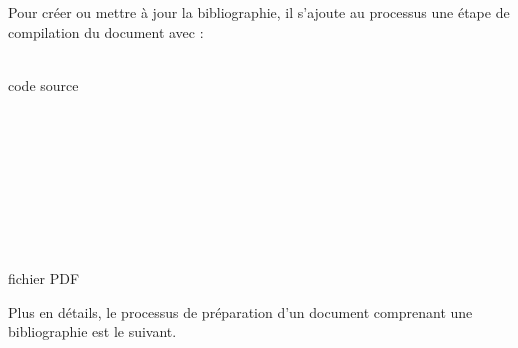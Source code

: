 Pour créer ou mettre à jour la bibliographie, il s'ajoute au processus
une étape de compilation du document avec {\BibTeX}:
\begin{center}
  \sffamily
  \begin{minipage}[t]{0.12\linewidth}
    \centering
    {\LARGE\faFile[regular]} \\ \medskip
    code source
  \end{minipage}
  \quad\faArrowRight\quad
  \begin{minipage}[t]{0.12\linewidth}
    \centering
    {\LARGE\faCogs} \\ \medskip
     \\ 
  \end{minipage}
  \quad\faArrowRight\quad
  \begin{minipage}[t]{0.12\linewidth}
    \centering
    {\LARGE\faCogs} \\ \medskip
  \end{minipage}
  \quad\faArrowRight\quad
  \begin{minipage}[t]{0.12\linewidth}
    \centering
    {\LARGE\faCogs}\;
    \raisebox{2pt}{\small $\times 2$} \\ \medskip
     \\ 
  \end{minipage}
  \quad\faArrowRight\quad
  \begin{minipage}[t]{0.12\linewidth}
    \centering
    {\LARGE\faFilePdf[regular]} \\ \medskip
    fichier PDF
  \end{minipage}
\end{center}

Plus en détails, le processus de préparation d'un document comprenant
une bibliographie est le suivant.

